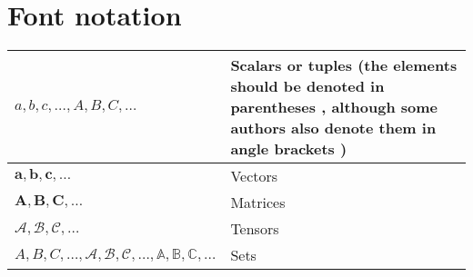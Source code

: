\section{Font notation}
\begin{xltabular}{\textwidth}{XX}
	$a,b,c, \dots, A, B, C, \dots$                                                                            & Scalars or tuples (the elements should be denoted in parentheses \cite{theodoridisMachineLearningBayesian2020}, although some authors also denote them in angle brackets \cite{brewkaArtificialIntelligenceModern1996}) \\ \hline
	$\mathbf{a}, \mathbf{b}, \mathbf{c}, \dots$                                                               & Vectors                                                                                                                                                                                                                 \\ \hline
	$\mathbf{A}, \mathbf{B}, \mathbf{C}, \dots$                                                               & Matrices                                                                                                                                                                                                                \\ \hline
	$\pmb{\mathcal{A}}, \pmb{\mathcal{B}}, \pmb{\mathcal{C}}, \dots$                                          & Tensors                                                                                                                                                                                                                 \\ \hline
	$A, B, C, \dots, \mathcal{A}, \mathcal{B}, \mathcal{C}, \dots, \mathbb{A}, \mathbb{B}, \mathbb{C}, \dots$ & Sets                                                                                                                                                                                                                    \\
\end{xltabular}